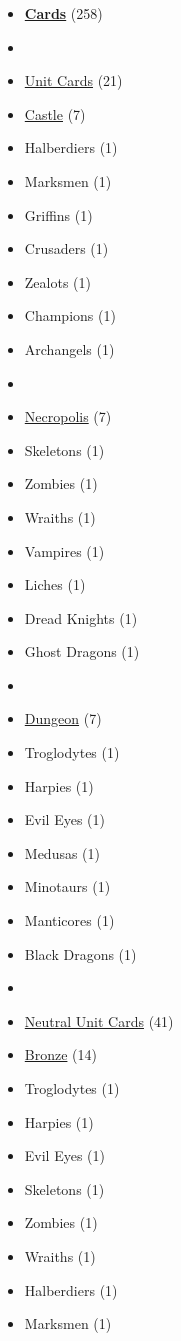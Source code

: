 \begin{multicols}{3}
\begin{itemize}[leftmargin=0pt, label={}, noitemsep, noitemsep]
  \item \textbf{\underline{Cards}} (258)
  \item
  \item \underline{Unit Cards} (21)
  \item \underline{Castle} (7)
  \item Halberdiers (1)
  \item Marksmen (1)
  \item Griffins (1)
  \item Crusaders (1)
  \item Zealots (1)
  \item Champions (1)
  \item Archangels (1)
  \item
  \item \underline{Necropolis} (7)
  \item Skeletons (1)
  \item Zombies (1)
  \item Wraiths (1)
  \item Vampires (1)
  \item Liches (1)
  \item Dread Knights (1)
  \item Ghost Dragons (1)
  \item
  \item \underline{Dungeon} (7)
  \item Troglodytes (1)
  \item Harpies (1)
  \item Evil Eyes (1)
  \item Medusas (1)
  \item Minotaurs (1)
  \item Manticores (1)
  \item Black Dragons (1)
  \item
  \item \underline{Neutral Unit Cards} (41)
  \item \underline{Bronze} (14)
  \item Troglodytes (1)
  \item Harpies (1)
  \item Evil Eyes (1)
  \item Skeletons (1)
  \item Zombies (1)
  \item Wraiths (1)
  \item Halberdiers (1)
  \item Marksmen (1)

\end{itemize}
\end{multicols}
